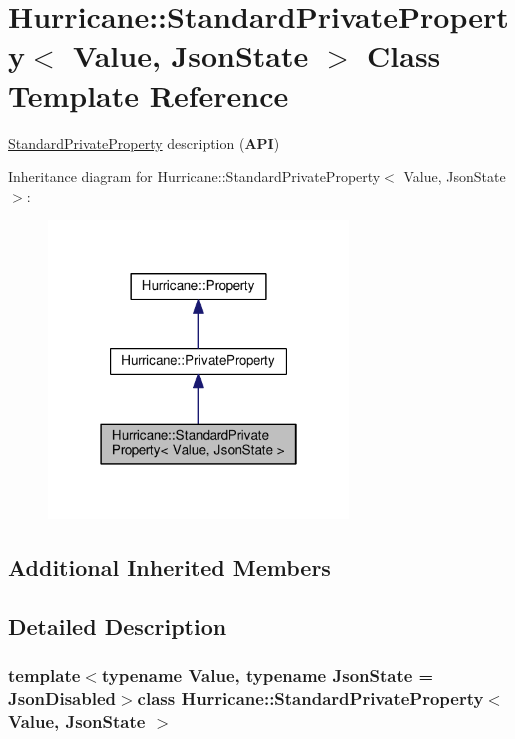 \hypertarget{classHurricane_1_1StandardPrivateProperty}{\section{Hurricane\-:\-:Standard\-Private\-Property$<$ Value, Json\-State $>$ Class Template Reference}
\label{classHurricane_1_1StandardPrivateProperty}
}


\hyperlink{classHurricane_1_1StandardPrivateProperty}{Standard\-Private\-Property} description ({\bfseries A\-P\-I})  




Inheritance diagram for Hurricane\-:\-:Standard\-Private\-Property$<$ Value, Json\-State $>$\-:\nopagebreak
\begin{figure}[H]
\begin{center}
\leavevmode
\includegraphics[width=226pt]{classHurricane_1_1StandardPrivateProperty__inherit__graph}
\end{center}
\end{figure}
\subsection*{Additional Inherited Members}


\subsection{Detailed Description}
\subsubsection*{template$<$typename Value, typename Json\-State = Json\-Disabled$>$class Hurricane\-::\-Standard\-Private\-Property$<$ Value, Json\-State $>$}


